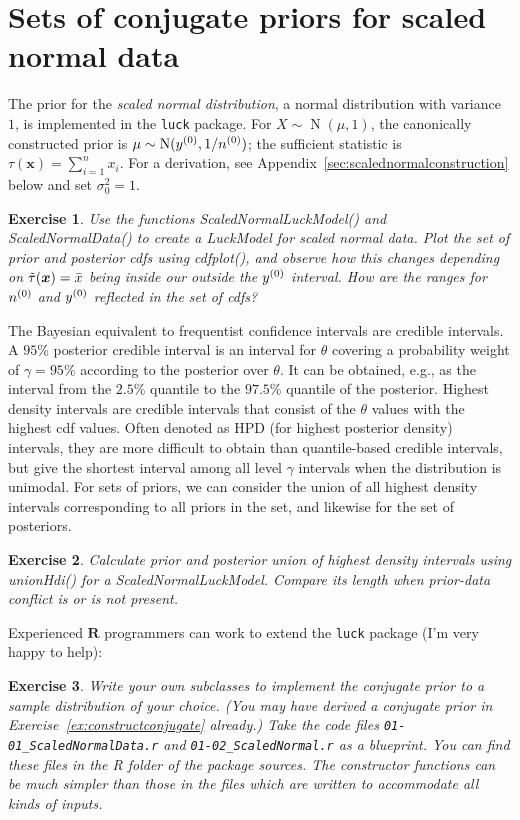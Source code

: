 \documentclass[12pt,a4paper	,twoside]{article}
\newcommand{\bs}[1]{\boldsymbol{#1}}
\renewcommand{\vec}[1]{{\bs#1}}
\newcommand{\norm}{\operatorname{N}}
\newcommand{\code}[1]{\emph{\ttfamily #1}}
\newtheorem{myex}{Exercise}
\begin{document}
\section{Sets of conjugate priors for scaled normal data}

The prior for the \emph{scaled normal distribution}, a normal distribution with variance $1$,
is implemented in the \texttt{luck} package.
For $X \sim \norm(\mu,1)$, the canonically constructed prior is $\mu \sim \norm(\yz, 1/\nz)$;
the sufficient statistic is $\tau(\vec{x}) = \sum_{i=1}^n x_i$.
For a derivation, see Appendix~\ref{sec:scalednormalconstruction} below and set $\sigma^2_0=1$.
\begin{myex}
Use the functions \code{ScaledNormalLuckModel()} and \code{ScaledNormalData()}
to create a \code{LuckModel} for scaled normal data.
Plot the set of prior and posterior cdfs using \code{cdfplot()},
and observe how this changes depending on $\ttaux = \bar{x}$ being inside our outside the $y^{(0)}$ interval.
How are the ranges for $n^{(0)}$ and $y^{(0)}$ reflected in the set of cdfs?
\end{myex}
The Bayesian equivalent to frequentist confidence intervals are credible intervals.
A $95$\% posterior credible interval is an interval for $\theta$
covering a probability weight of $\gamma = 95$\% according to the posterior over $\theta$.
It can be obtained, e.g., as the interval from the $2.5$\% quantile to the $97.5$\% quantile of the posterior.
Highest density intervals are credible intervals that consist of the $\theta$ values with the highest cdf values.
Often denoted as HPD (for highest posterior density) intervals, 
they are more difficult to obtain than quantile-based credible intervals,
but give the shortest interval among all level $\gamma$ intervals when the distribution is unimodal.
For sets of priors, we can consider the union of all highest density intervals corresponding to all priors in the set,
and likewise for the set of posteriors.
\begin{myex}
Calculate prior and posterior union of highest density intervals using \code{unionHdi()}
for a \code{ScaledNormalLuckModel}.
Compare its length when prior-data conflict is or is not present. 
\end{myex}
%
Experienced $\textbf{R}$ programmers can work to extend the \texttt{luck} package (I'm very happy to help):
\begin{myex}
Write your own subclasses to implement the conjugate prior to a sample distribution of your choice.
(You may have derived a conjugate prior in Exercise~\ref{ex:constructconjugate} already.)
Take the code files \verb+01-01_ScaledNormalData.r+ and \verb+01-02_ScaledNormal.r+ as a blueprint.
You can find these files in the \code{R} folder of the package sources.
The constructor functions can be much simpler than those in the files which are written to accommodate all kinds of inputs.
\end{myex}
\end{document}
